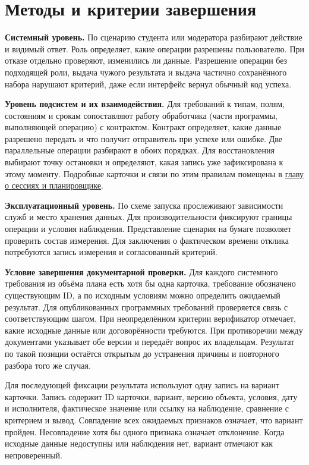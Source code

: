 \documentclass[12pt,a4paper]{article}
\begin{document}
\section{Методы и критерии завершения}\label{ux43cux435ux442ux43eux434ux44b-ux438-ux43aux440ux438ux442ux435ux440ux438ux438-ux437ux430ux432ux435ux440ux448ux435ux43dux438ux44f}

\hypertarget{методы-и-критерии-завершения}{}

\textbf{Системный уровень.} По сценарию студента или модератора разбирают действие и видимый ответ. Роль определяет, какие операции разрешены пользователю. При отказе отдельно проверяют, изменились ли данные. Разрешение операции без подходящей роли, выдача чужого результата и выдача частично сохранённого набора нарушают критерий, даже если интерфейс вернул обычный код успеха.

\textbf{Уровень подсистем и их взаимодействия.} Для требований к типам, полям, состояниям и срокам сопоставляют работу обработчика (части программы, выполняющей операцию) с контрактом. Контракт определяет, какие данные разрешено передать и что получит отправитель при успехе или ошибке. Две параллельные операции разбирают в обоих порядках. Для восстановления выбирают точку остановки и определяют, какая запись уже зафиксирована к этому моменту. Подробные карточки и связи по этим правилам помещены в {\hyperlink{doc-10-верификация-сессий-задач-и-планировщика}{главу о сессиях и планировщике}}.

\textbf{Эксплуатационный уровень.} По схеме запуска прослеживают зависимости служб и место хранения данных. Для производительности фиксируют границы операции и условия наблюдения. Представление сценария на бумаге позволяет проверить состав измерения. Для заключения о фактическом времени отклика потребуются запись измерения и согласованный критерий.

\textbf{Условие завершения документарной проверки.} Для каждого системного требования из объёма плана есть хотя бы одна карточка, требование обозначено существующим ID, а по исходным условиям можно определить ожидаемый результат. Для опубликованных программных требований проверяется связь с соответствующим шагом. При неопределённом критерии верификатор отмечает, какие исходные данные или договорённости требуются. При противоречии между документами указывает обе версии и передаёт вопрос их владельцам. Результат по такой позиции остаётся открытым до устранения причины и повторного разбора того же случая.

Для последующей фиксации результата используют одну запись на вариант карточки. Запись содержит ID карточки, вариант, версию объекта, условия, дату и исполнителя, фактическое значение или ссылку на наблюдение, сравнение с критерием и вывод. Совпадение всех ожидаемых признаков означает, что вариант пройден. Несовпадение хотя бы одного признака означает отклонение. Когда исходные данные недоступны или наблюдения нет, вариант отмечают как непроверенный.
\end{document}
